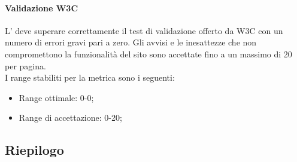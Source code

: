 			\paragraph[Validazione \gloss{W3C}]{\hypertarget{vw}{Validazione W3C}}
			L' deve superare correttamente il test di validazione offerto da W3C con un numero di errori gravi pari a zero. Gli avvisi e le inesattezze che non compromettono la funzionalità del sito sono accettate fino a un massimo di 20 per pagina.
			\\I range stabiliti per la metrica sono i seguenti:
			\begin{itemize}
				\item Range ottimale: 0-0;
				\item Range di accettazione: 0-20;
			\end{itemize}
	\subsection{Riepilogo}

